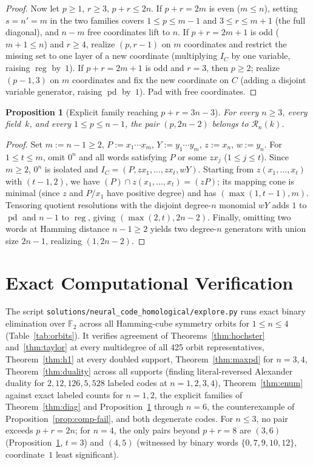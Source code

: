 \documentclass[11pt]{article}
\theoremstyle{plain}
\newtheorem{proposition}[theorem]{Proposition}
\theoremstyle{definition}
\theoremstyle{remark}
\DeclareMathOperator{\pd}{pd}
\DeclareMathOperator{\reg}{reg}
\begin{document}
\begin{proof}
Now let $p \ge 1$, $r \ge 3$, $p+r \le 2n$. If $p+r = 2m$ is even ($m \le n$), setting $s = n' = m$ in the two families covers $1 \le p \le m-1$ and $3 \le r \le m+1$ (the full diagonal), and $n-m$ free coordinates lift to $n$. If $p+r = 2m+1$ is odd ($m+1 \le n$) and $r \ge 4$, realize $(p,r-1)$ on $m$ coordinates and restrict the missing set to one layer of a new coordinate (multiplying $I_C$ by one variable, raising $\reg$ by~$1$). If $p+r = 2m+1$ is odd and $r = 3$, then $p \ge 2$; realize $(p-1,3)$ on $m$ coordinates and fix the new coordinate on $C$ (adding a disjoint variable generator, raising $\pd$ by~$1$). Pad with free coordinates.
\end{proof}

\begin{proposition}[Explicit family reaching $p+r = 3n-3$]\label{prop:beyond}
For every $n \ge 3$, every field~$k$, and every $1 \le p \le n-1$, the pair $(p, 2n-2)$ belongs to $\mathcal{R}_n(k)$.
\end{proposition}

\begin{proof}
Set $m := n-1 \ge 2$, $P := x_1\cdots x_m$, $Y := y_1\cdots y_m$, $z := x_n$, $w := y_n$. For $1 \le t \le m$, omit $0^n$ and all words satisfying $P$ or some $z x_j$ ($1 \le j \le t$). Since $m \ge 2$, $0^n$ is isolated and $I_C = (P, z x_1, \dots, z x_t, w Y)$. Starting from $z(x_1,\dots,x_t)$ with $(t-1, 2)$, we have $(P) \cap z(x_1,\dots,x_t) = (zP)$; its mapping cone is minimal (since $z$ and $P/x_1$ have positive degree) and has $(\max(1,t-1), m)$. Tensoring quotient resolutions with the disjoint degree-$n$ monomial $wY$ adds $1$ to $\pd$ and $n-1$ to $\reg$, giving $(\max(2,t), 2n-2)$. Finally, omitting two words at Hamming distance $n-1 \ge 2$ yields two degree-$n$ generators with union size $2n-1$, realizing $(1, 2n-2)$.
\end{proof}

\section{Exact Computational Verification}

The script \texttt{solutions/neural\_code\_homological/explore.py} runs exact binary elimination over $\mathbb{F}_2$ across all Hamming-cube symmetry orbits for $1 \le n \le 4$ (Table~\ref{tab:orbits}). It verifies agreement of Theorems~\ref{thm:hochster} and~\ref{thm:taylor} at every multidegree of all 425 orbit representatives, Theorem~\ref{thm:h1} at every doubled support, Theorem~\ref{thm:maxpd} for $n=3,4$, Theorem~\ref{thm:duality} across all supports (finding literal-reversed Alexander duality for $2, 12, 126, 5{,}528$ labeled codes at $n=1,2,3,4$), Theorem~\ref{thm:enum} against exact labeled counts for $n=1,2$, the explicit families of Theorem~\ref{thm:diag} and Proposition~\ref{prop:beyond} through $n=6$, the counterexample of Proposition~\ref{prop:comp-fail}, and both degenerate codes. For $n \le 3$, no pair exceeds $p+r = 2n$; for $n=4$, the only pairs beyond $p+r=8$ are $(3,6)$ (Proposition~\ref{prop:beyond}, $t=3$) and $(4,5)$ (witnessed by binary words $\{0,7,9,10,12\}$, coordinate~$1$ least significant).
\end{document}
